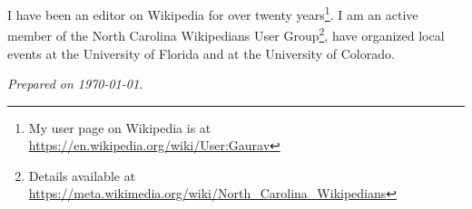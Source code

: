 \documentclass[12pt,letter]{article}
\begin{document}
I have been an editor on Wikipedia for over twenty years\footnote{My user page on Wikipedia is at \url{https://en.wikipedia.org/wiki/User:Gaurav}}. I am an active member of the North Carolina Wikipedians User Group\footnote{Details available at \url{https://meta.wikimedia.org/wiki/North\_Carolina\_Wikipedians}}, have organized local events at the University of Florida and at the University of Colorado.

\begin{center}


\small

\textit{Prepared on \today.}

\end{center}
\end{document}
